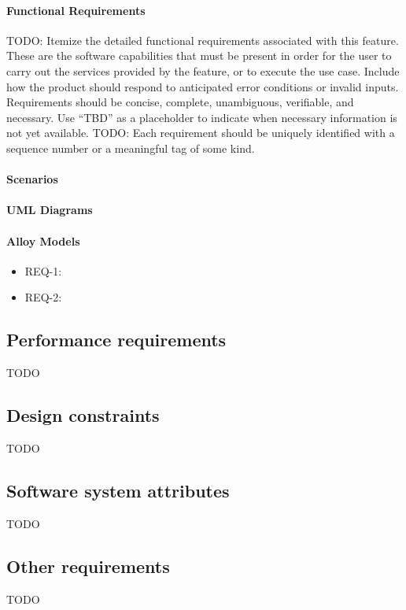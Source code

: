 \paragraph{Functional Requirements}
TODO: Itemize the detailed functional requirements associated with this feature. These are the software capabilities that must be present in order for the user to carry out the services provided by the feature, or to execute the use case. Include how the product should respond to anticipated error conditions or invalid inputs. Requirements should be concise, complete, unambiguous, verifiable, and necessary. Use “TBD” as a placeholder to indicate when necessary information is not yet available.
TODO: Each requirement should be uniquely identified with a sequence number or a meaningful tag of some kind.
\paragraph{Scenarios}
\paragraph{UML Diagrams}
\paragraph{Alloy Models}
\begin{itemize}
   \item REQ-1:  
   \item REQ-2:
\end{itemize}
\subsection{Performance requirements}
TODO
\subsection{Design constraints}
TODO
\subsection{Software system attributes}
TODO
\subsection{Other requirements}
TODO